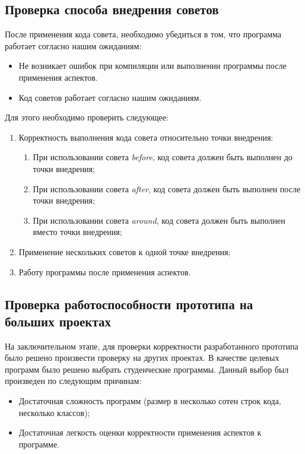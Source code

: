 \subsection{Проверка способа внедрения советов}
\label{subs:advice_weaving_testing_program}
После применения кода совета, необходимо убедиться в том, что программа работает согласно нашим ожиданиям:
\begin{itemize}
	\item Не возникает ошибок при компиляции или выполнении программы после применения аспектов.
	\item Код советов работает согласно нашим ожиданиям.
\end{itemize}
Для этого необходимо проверить следующее:
\begin{enumerate}
    \item \label{list:advice_weaving_check}Корректность выполнения кода совета относительно точки внедрения:
    \begin{enumerate}
        \item \label{list:before_advice_weaving_check}При использовании совета \textit{before}, код совета должен быть выполнен до точки внедрения;
        \item \label{list:after_advice_weaving_check}При использовании совета \textit{after}, код совета должен быть выполнен после точки внедрения;
        \item \label{list:around_advice_weaving_check}При использовании совета \textit{around}, код совета должен быть выполнен вместо точки внедрения;
    \end{enumerate}
    \item \label{list:several_advices_weaving_check}Применение нескольких советов к одной точке внедрения;
    \item \label{list:program_work_check}Работу программы после применения аспектов.
\end{enumerate}
\subsection{Проверка работоспособности прототипа на больших проектах}
\label{subs:students_testing_program}
На заключительном этапе, для проверки корректности разработанного прототипа было решено произвести проверку на других проектах.
В качестве целевых программ было решено выбрать студенческие программы.
Данный выбор был произведен по следующим причинам:
\begin{itemize}
	\item Достаточная сложность программ (размер в несколько сотен строк кода, несколько классов);
	\item Достаточная легкость оценки корректности применения аспектов к программе.
\end{itemize}
